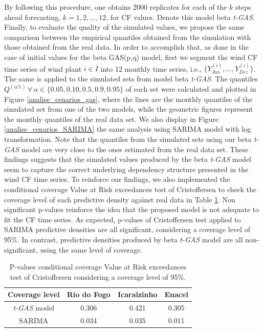 \documentclass[a4paper]{IEEEtran}
\begin{document}
By following this procedure, one obtains 2000 replicates for each of the $k$ steps ahead forecasting, $k=1,2,...,12$, for CF values. Denote this model beta \emph{t-GAS}. Finally, to evaluate the quality of the simulated values, we propose the same comparison between the empirical quantiles obtained from the simulation with those obtained from the real data. In order to accomplish that, as done in the case of initial values for the beta GAS(p,q) model, first we segment the wind CF time series of wind plant $i \in I$ into 12 monthly time series, i.e., $\{Y_{Jan}^{(i)},..., Y_{Dez}^{(i)}\}$. The same is applied to the simulated sets from model beta \emph{t-GAS}. The quantiles $Q^{(\alpha\%)}\, \forall \,\alpha \in \{0.05, 0.10, 0.5, 0.9, 0.95 \}$ of each set were calculated and plotted in Figure \ref{analise_cenarios_gas}, where the lines are the monthly quantiles of the simulated set from one of the two models, while the geometric figures represent the monthly quantiles of the real data set. We also display in Figure \ref{analise_cenarios_SARIMA} the same analysis using SARIMA model with log transformation. Note that the quantiles from the simulated sets using our beta \emph{t-GAS} model are very close to the ones estimated from the real data set. These findings suggests that the simulated values produced by the beta \emph{t-GAS} model seem to capture the correct underlying dependency structure presented in the wind CF time series. To reinforce our findings, we also implemented the conditional coverage Value at Risk exceedances test of Cristoffersen \cite{christoffersen1998evaluating} to check the coverage level of each predictive density against real data in Table \ref{cristofersen}. Non significant p-values reinforce the idea that the proposed model is not adequate to fit the CF time series. As expected, p-values of Cristoffersen test applied to SARIMA predictive densities are all significant, considering a coverage level of 95\%. In contrast, predictive densities produced by beta \emph{t-GAS} model are all non-significant, using the same level of coverage.

\begin{table}[htbp]
\centering
\caption{P-values conditional coverage Value at Risk exceedances test of Cristoffersen considering a coverage level of 95\%.}
\begin{tabular}{c|ccc}
\hline
{\bf Coverage level}      & {\bf Rio do Fogo} & {\bf Icaraizinho} & {\bf Enacel} \\ \hline
\emph{t-GAS} model   & 0.306             & 0.421           & 0.305        \\
SARIMA               & 0.034             & 0.035           & 0.011   \\ \hline     
\end{tabular}
\label{cristofersen}
\end{table}
\end{document}
